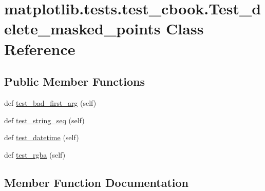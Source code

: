 \hypertarget{classmatplotlib_1_1tests_1_1test__cbook_1_1Test__delete__masked__points}{}\section{matplotlib.\+tests.\+test\+\_\+cbook.\+Test\+\_\+delete\+\_\+masked\+\_\+points Class Reference}
\label{classmatplotlib_1_1tests_1_1test__cbook_1_1Test__delete__masked__points}
\subsection*{Public Member Functions}
\begin{DoxyCompactItemize}
\item 
def \hyperlink{classmatplotlib_1_1tests_1_1test__cbook_1_1Test__delete__masked__points_a996bfeed0e1555d0d6bb37af7d155963}{test\+\_\+bad\+\_\+first\+\_\+arg} (self)
\item 
def \hyperlink{classmatplotlib_1_1tests_1_1test__cbook_1_1Test__delete__masked__points_a20cee836337182ef319ddf9cb76f8e66}{test\+\_\+string\+\_\+seq} (self)
\item 
def \hyperlink{classmatplotlib_1_1tests_1_1test__cbook_1_1Test__delete__masked__points_acb4e53b819460881245712512c0dd3eb}{test\+\_\+datetime} (self)
\item 
def \hyperlink{classmatplotlib_1_1tests_1_1test__cbook_1_1Test__delete__masked__points_a6c0496bf401e095d14d038fa26ed3669}{test\+\_\+rgba} (self)
\end{DoxyCompactItemize}


\subsection{Member Function Documentation}
\mbox{\label{classmatplotlib_1_1tests_1_1test__cbook_1_1Test__delete__masked__points_a996bfeed0e1555d0d6bb37af7d155963}} 
